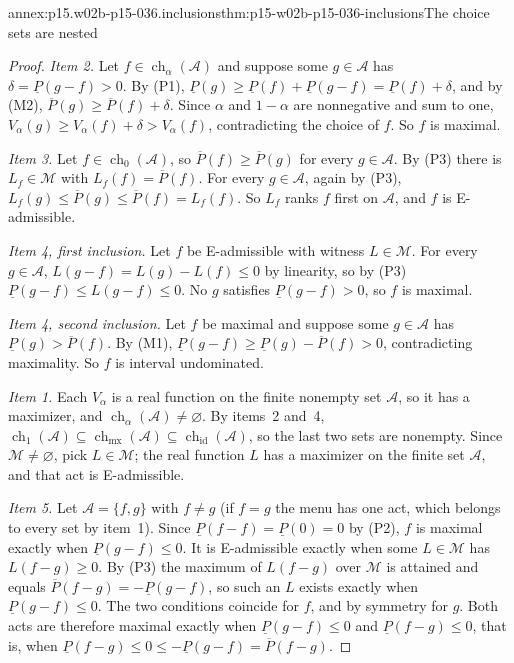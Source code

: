 \begin{annexitem}{annex:p15.w02b-p15-036.inclusions}{thm:p15-w02b-p15-036-inclusions}{The choice sets are nested}
\begin{proof}
\emph{Item 2.} Let \(f\in\operatorname{ch}_\alpha(\mathcal A)\) and
suppose some \(g\in\mathcal A\) has \(\delta=\underline P(g-f)>0\). By
(P1), \(\underline P(g)\geq\underline P(f)+\underline P(g-f)
=\underline P(f)+\delta\), and by (M2),
\(\overline P(g)\geq\overline P(f)+\delta\). Since \(\alpha\) and
\(1-\alpha\) are nonnegative and sum to one,
\(V_\alpha(g)\geq V_\alpha(f)+\delta>V_\alpha(f)\), contradicting the
choice of \(f\). So \(f\) is maximal.

\emph{Item 3.} Let \(f\in\operatorname{ch}_0(\mathcal A)\), so
\(\overline P(f)\geq\overline P(g)\) for every \(g\in\mathcal A\). By
(P3) there is \(L_f\in\mathcal M\) with \(L_f(f)=\overline P(f)\). For
every \(g\in\mathcal A\), again by (P3),
\(L_f(g)\leq\overline P(g)\leq\overline P(f)=L_f(f)\). So \(L_f\) ranks
\(f\) first on \(\mathcal A\), and \(f\) is E-admissible.

\emph{Item 4, first inclusion.} Let \(f\) be E-admissible with witness
\(L\in\mathcal M\). For every \(g\in\mathcal A\),
\(L(g-f)=L(g)-L(f)\leq0\) by linearity, so by (P3)
\(\underline P(g-f)\leq L(g-f)\leq0\). No \(g\) satisfies
\(\underline P(g-f)>0\), so \(f\) is maximal.

\emph{Item 4, second inclusion.} Let \(f\) be maximal and suppose some
\(g\in\mathcal A\) has \(\underline P(g)>\overline P(f)\). By (M1),
\(\underline P(g-f)\geq\underline P(g)-\overline P(f)>0\), contradicting
maximality. So \(f\) is interval undominated.

\emph{Item 1.} Each \(V_\alpha\) is a real function on the finite nonempty
set \(\mathcal A\), so it has a maximizer, and
\(\operatorname{ch}_\alpha(\mathcal A)\ne\varnothing\). By items~2 and~4,
\(\operatorname{ch}_1(\mathcal A)\subseteq\operatorname{ch}_{\mathrm{mx}}
(\mathcal A)\subseteq\operatorname{ch}_{\mathrm{id}}(\mathcal A)\), so the
last two sets are nonempty. Since \(\mathcal M\ne\varnothing\), pick
\(L\in\mathcal M\); the real function \(L\) has a maximizer on the finite
set \(\mathcal A\), and that act is E-admissible.

\emph{Item 5.} Let \(\mathcal A=\{f,g\}\) with \(f\ne g\) (if \(f=g\) the
menu has one act, which belongs to every set by item~1). Since
\(\underline P(f-f)=\underline P(0)=0\) by (P2), \(f\) is maximal exactly
when \(\underline P(g-f)\leq0\). It is E-admissible exactly when some
\(L\in\mathcal M\) has \(L(f-g)\geq0\). By (P3) the maximum of
\(L(f-g)\) over \(\mathcal M\) is attained and equals
\(\overline P(f-g)=-\underline P(g-f)\), so such an \(L\) exists exactly
when \(\underline P(g-f)\leq0\). The two conditions coincide for \(f\),
and by symmetry for \(g\). Both acts are therefore maximal exactly when
\(\underline P(g-f)\leq0\) and \(\underline P(f-g)\leq0\), that is, when
\(\underline P(f-g)\leq0\leq-\underline P(g-f)=\overline P(f-g)\).


\end{proof}
\end{annexitem}
